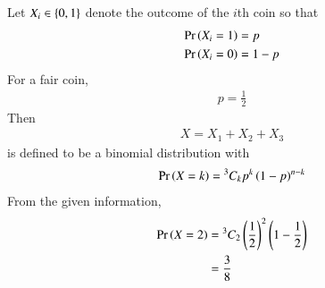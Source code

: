 Let $X_i \in \left\{0,1\right\}$ denote the outcome of the $i$th coin so that
\begin{align}
\Pr\left(X_i = 1\right) &= p 
\\
\Pr\left(X_i = 0\right) &= 1-p
\end{align}
For a fair coin, 
\begin{align}
p = \frac{1}{2}
\end{align}
Then
\begin{align}
X = X_1 + X_2 + X_3
\end{align}
 is defined to be a binomial distribution with 
\begin{align}
\Pr\left(X = k\right) = {}^{3}C_{k}p^k\left(1-p\right)^{n-k}
\end{align}
From the given information,
\begin{align}
\Pr\left(X = 2\right) &= {}^{3}C_{2}\left(\frac{1}{2}\right)^2\left(1-\frac{1}{2}\right)
\\
&=\frac{3}{8}
\end{align}
